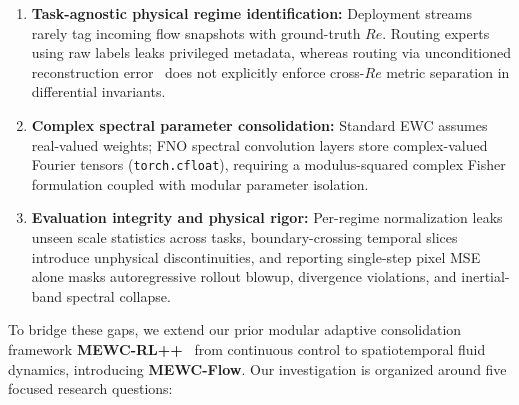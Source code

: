 \documentclass[11pt,a4paper]{article}
\begin{document}
\begin{enumerate}
  \item \textbf{Task-agnostic physical regime identification:} Deployment streams rarely tag incoming flow snapshots with ground-truth $Re$. Routing experts using raw labels leaks privileged metadata, whereas routing via unconditioned reconstruction error~\cite{ji2026pmoe,kim2026mgann} does not explicitly enforce cross-$Re$ metric separation in differential invariants.
  \item \textbf{Complex spectral parameter consolidation:} Standard EWC assumes real-valued weights; FNO spectral convolution layers store complex-valued Fourier tensors (\texttt{torch.cfloat}), requiring a modulus-squared complex Fisher formulation coupled with modular parameter isolation.
  \item \textbf{Evaluation integrity and physical rigor:} Per-regime normalization leaks unseen scale statistics across tasks, boundary-crossing temporal slices introduce unphysical discontinuities, and reporting single-step pixel MSE alone masks autoregressive rollout blowup, divergence violations, and inertial-band spectral collapse.
\end{enumerate}

To bridge these gaps, we extend our prior modular adaptive consolidation framework \textbf{MEWC-RL++}~\cite{hasan2026mewcrlpp} from continuous control to spatiotemporal fluid dynamics, introducing \textbf{MEWC-Flow}. Our investigation is organized around five focused research questions:
\end{document}
